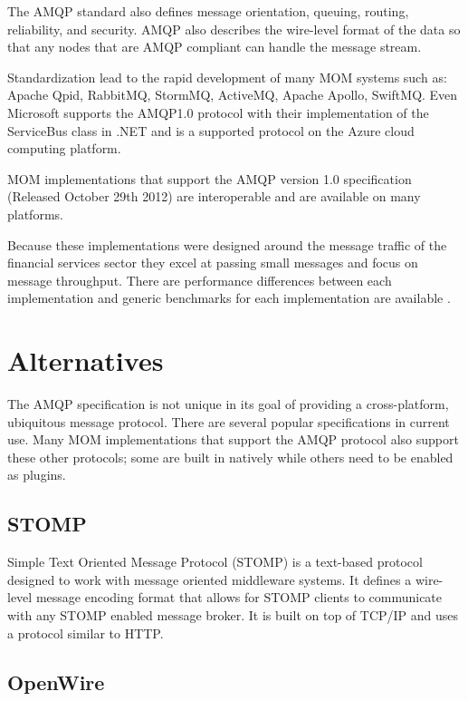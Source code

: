 \documentclass{thesis}
\begin{document}
The AMQP standard also defines message orientation, queuing, routing, reliability, and security.   AMQP also describes the wire-level format of the data so that any nodes that are AMQP compliant can handle the message stream.  

Standardization lead to the rapid development of many MOM systems such as: Apache Qpid, RabbitMQ, StormMQ, ActiveMQ, Apache Apollo, SwiftMQ.  Even Microsoft supports the AMQP1.0 protocol with their implementation of the ServiceBus class in .NET  and is a supported protocol on the Azure cloud computing platform.  

MOM implementations that support the AMQP version 1.0 specification (Released October 29th 2012) \cite{todo} are interoperable and are available on many platforms.  


Because these implementations were designed around the message traffic of the financial services sector they excel at passing small messages and focus on message throughput.  There are performance differences between each implementation and generic benchmarks for each implementation are available \cite{todo}\cite{todo}.


\section{Alternatives}
The AMQP specification is not unique in its goal of providing a cross-platform, ubiquitous message protocol.  There are several popular specifications in current use.  Many MOM implementations that support the AMQP protocol also support these other protocols; some are built in natively while others need to be enabled as plugins.   

\subsection{STOMP}
Simple Text Oriented Message Protocol (STOMP) is a text-based protocol designed to work with message oriented middleware systems.  It defines a wire-level message encoding format that allows for STOMP clients to communicate with any STOMP enabled message broker.  It is built on top of TCP/IP and uses a protocol similar to HTTP.  

\subsection{OpenWire}
\end{document}
